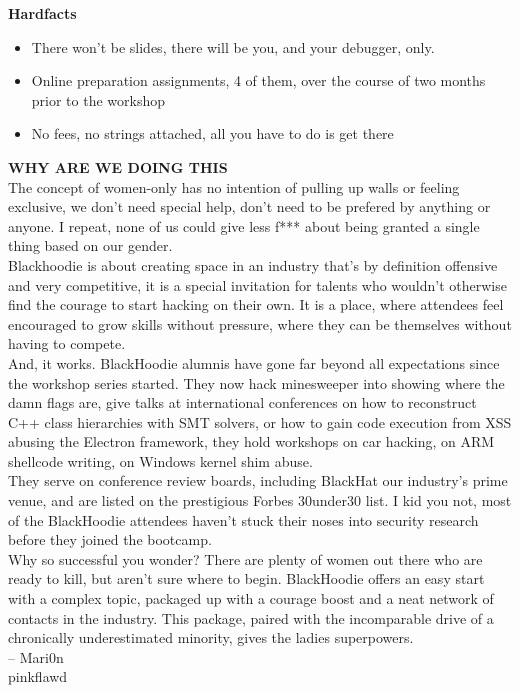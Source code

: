 \textbf{Hardfacts}
\begin{itemize}
	\item There won’t be slides, there will be you, and your debugger, only.
	\item Online preparation assignments, 4 of them, over the course of two months prior to the workshop
	\item No fees, no strings attached, all you have to do is get there
\end{itemize}

\textbf{WHY ARE WE DOING THIS}\\

The concept of women-only has no intention of pulling up walls or feeling exclusive, we don’t need special help, don’t need to be prefered by anything or anyone. I repeat, none of us could give less f*** about being granted a single thing based on our gender.\\

Blackhoodie is about creating space in an industry that’s by definition offensive and very competitive, it is a special invitation for talents who wouldn’t otherwise find the courage to start hacking on their own. It is a place, where attendees feel encouraged to grow skills without pressure, where they can be themselves without having to compete.\\

And, it works. BlackHoodie alumnis have gone far beyond all expectations since the workshop series started. They now hack minesweeper into showing where the damn flags are, give talks at international conferences on how to reconstruct C++ class hierarchies with SMT solvers, or how to gain code execution from XSS abusing the Electron framework, they hold workshops on car hacking, on ARM shellcode writing, on Windows kernel shim abuse.\\

They serve on conference review boards, including BlackHat our industry’s prime venue, and are listed on the prestigious Forbes 30under30 list. I kid you not, most of the BlackHoodie attendees haven’t stuck their noses into security research before they joined the bootcamp.\\

Why so successful you wonder? There are plenty of women out there who are ready to kill, but aren’t sure where to begin. BlackHoodie offers an easy start with a complex topic, packaged up with a courage boost and a neat network of contacts in the industry. This package, paired with the incomparable drive of a chronically underestimated minority, gives the ladies superpowers.\\

– Mari0n \\
\faTwitter \hspace{0.05cm} pinkflawd
